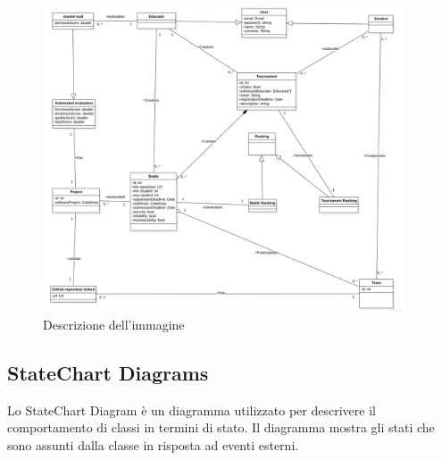 \begin{figure}[h] %
  \centering %
  \includegraphics[width=0.95\textwidth]{ClassDiagram.png} %
  \caption{Descrizione dell'immagine} %
  \label{fig:etichetta} %
\end{figure}




\subsection{StateChart Diagrams}
Lo StateChart Diagram è un diagramma utilizzato per descrivere il comportamento di classi in termini di stato. Il diagramma mostra gli stati che sono assunti  dalla classe in risposta ad eventi esterni.

